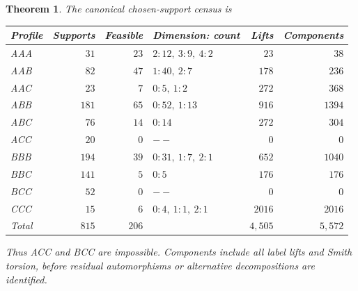 \documentclass[11pt,a4paper]{article}
\newtheorem{theorem}{Theorem}[section]
\theoremstyle{plain}
\theoremstyle{definition}
\numberwithin{equation}{section}
\begin{document}
\begin{theorem}\label{thm:census}
The canonical chosen-support census is
\begin{center}\small \begin{tabular}{lrrlrr}\toprule Profile & Supports & Feasible & Dimension: count & Lifts & Components\\\midrule
AAA&$31$&$23$&$2:12,\ 3:9,\ 4:2$&$23$&$38$\\
AAB&$82$&$47$&$1:40,\ 2:7$&$178$&$236$\\
AAC&$23$&$7$&$0:5,\ 1:2$&$272$&$368$\\
ABB&$181$&$65$&$0:52,\ 1:13$&$916$&$1394$\\
ABC&$76$&$14$&$0:14$&$272$&$304$\\
ACC&$20$&$0$&$--$&$0$&$0$\\
BBB&$194$&$39$&$0:31,\ 1:7,\ 2:1$&$652$&$1040$\\
BBC&$141$&$5$&$0:5$&$176$&$176$\\
BCC&$52$&$0$&$--$&$0$&$0$\\
CCC&$15$&$6$&$0:4,\ 1:1,\ 2:1$&$2016$&$2016$\\
\midrule Total&$815$&$206$&&$4{,}505$&$5{,}572$\\\bottomrule\end{tabular}\end{center}
Thus ACC and BCC are impossible. Components include all label lifts and Smith torsion, before residual automorphisms or alternative decompositions are identified.
\end{theorem}
\end{document}
